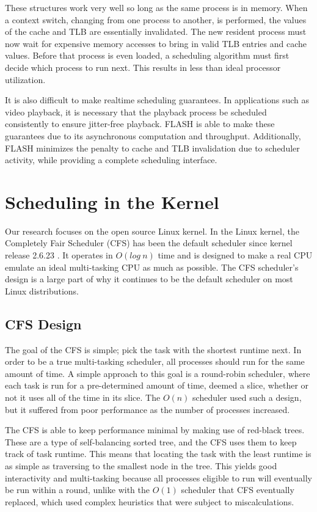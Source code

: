 \documentclass{sig-alternate-10pt}
\begin{document}
These structures work very well so long as the same process is in memory. When a context switch, changing from one process to another, is performed, the values of the cache and TLB are essentially invalidated. The new resident process must now wait for expensive memory accesses to bring in valid TLB entries and cache values. Before that process is even loaded, a scheduling algorithm must first decide which process to run next. This results in less than ideal processor utilization.

It is also difficult to make realtime scheduling guarantees. In applications such as video playback, it is necessary that the playback process be scheduled consistently to ensure jitter-free playback. FLASH is able to make these guarantees due to its asynchronous computation and throughput. Additionally, FLASH minimizes the penalty to cache and TLB invalidation due to scheduler activity, while providing a complete scheduling interface.

\section{Scheduling in the Kernel}

Our research focuses on the open source Linux kernel. In the Linux kernel, the Completely Fair Scheduler (CFS) has been the default scheduler since kernel release 2.6.23 \cite{cfsdesign}. It operates in $ O(log\ n) $ time and is designed to make a real CPU emulate an ideal multi-tasking CPU as much as possible. The CFS scheduler's design is a large part of why it continues to be the default scheduler on most Linux distributions.

\subsection{CFS Design}
The goal of the CFS is simple; pick the task with the shortest runtime next. In order to be a true multi-tasking scheduler, all processes should run for the same amount of time. A simple approach to this goal is a round-robin scheduler, where each task is run for a pre-determined amount of time, deemed a slice, whether or not it uses all of the time in its slice. The $O(n)$ scheduler used such a design, but it suffered from poor performance as the number of processes increased.

The CFS is able to keep performance minimal by making use of red-black trees. These are a type of self-balancing sorted tree, and the CFS uses them to keep track of task runtime. This means that locating the task with the least runtime is as simple as traversing to the smallest node in the tree. This yields good interactivity and multi-tasking because all processes eligible to run will eventually be run within a round, unlike with the $O(1)$ scheduler that CFS eventually replaced, which used complex heuristics that were subject to miscalculations.
\end{document}

